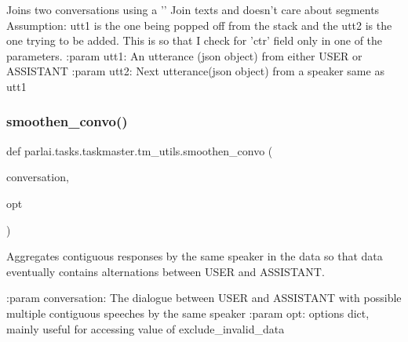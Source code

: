 \begin{DoxyVerb}Joins two conversations using a '\n'
Join texts and doesn't care about segments
Assumption: utt1 is the one being popped off from the stack and the utt2
            is the one trying to be added. This is so that I check for 'ctr'
            field only in one of the parameters.
:param utt1:
    An utterance (json object) from either USER or ASSISTANT
:param utt2:
    Next utterance(json object) from a speaker same as utt1
\end{DoxyVerb}
 \mbox{\label{namespaceparlai_1_1tasks_1_1taskmaster_1_1tm__utils_ad9cc917cf497b3cd81ccb76a719cf1b7}} 
\subsubsection{\texorpdfstring{smoothen\+\_\+convo()}{smoothen\_convo()}}
{\footnotesize\ttfamily def parlai.\+tasks.\+taskmaster.\+tm\+\_\+utils.\+smoothen\+\_\+convo (\begin{DoxyParamCaption}\item[{}]{conversation,  }\item[{}]{opt }\end{DoxyParamCaption})}

\begin{DoxyVerb}Aggregates contiguous responses by the same speaker in the data so that data
eventually contains alternations between USER and ASSISTANT.

:param conversation:
    The dialogue between USER and ASSISTANT with possible multiple contiguous
    speeches by the same speaker
:param opt:
    options dict, mainly useful for accessing value of exclude_invalid_data
\end{DoxyVerb}
 \mbox{\label{namespaceparlai_1_1tasks_1_1taskmaster_1_1tm__utils_ad0c8c99eb4b5152ca8cec2a8fe7895fd}} 
